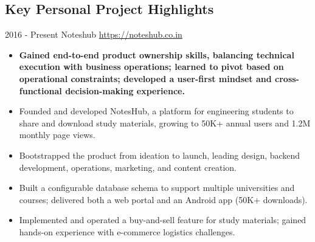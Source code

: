 \documentclass[letterpaper]{twentysecondcv} %
\begin{document}
\begin{fullwidth}
\section{Key Personal Project Highlights}
\begin{twenty}
    \twentyitem
    	{2016 - }
            {Present}
        {Noteshub}
        {\href{https://noteshub.co.in/}{https://noteshub.co.in}}
        {}
        {
        {\begin{itemize}
        \item \textbf{Gained end-to-end product ownership skills, balancing technical execution with business operations; learned to pivot based on operational constraints; developed a user-first mindset and cross-functional decision-making experience.}
        \item Founded and developed NotesHub, a platform for engineering students to share and download study materials, growing to 50K+ annual users and 1.2M monthly page views.
        \item Bootstrapped the product from ideation to launch, leading design, backend development, operations, marketing, and content creation.
        \item Built a configurable database schema to support multiple universities and courses; delivered both a web portal and an Android app (50K+ downloads).
        \item Implemented and operated a buy-and-sell feature for study materials; gained hands-on experience with e-commerce logistics challenges.
        \end{itemize}}
        }
    \\
\end{twenty}
\end{fullwidth}
\end{document}
